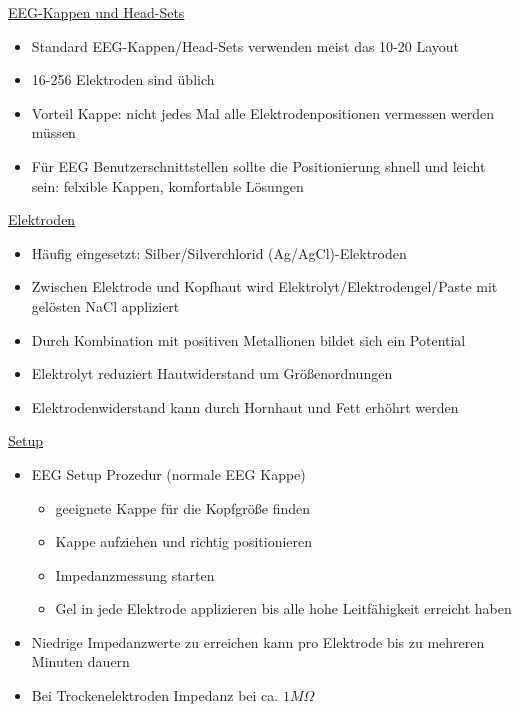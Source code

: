 \documentclass[a4paper,10pt,oneside]{article}
\begin{document}
\underline{EEG-Kappen und Head-Sets} \\
	\begin{itemize}
		\item Standard EEG-Kappen/Head-Sets verwenden meist das 10-20 Layout
		\item 16-256 Elektroden sind üblich
		\item Vorteil Kappe: nicht jedes Mal alle Elektrodenpositionen vermessen werden müssen
		\item Für EEG Benutzerschnittstellen sollte die Positionierung shnell und leicht sein: felxible Kappen, komfortable Lösungen
	\end{itemize}
 		
\underline{Elektroden} \\
	\begin{itemize}
		\item Häufig eingesetzt: Silber/Silverchlorid (Ag/AgCl)-Elektroden
		\item Zwischen Elektrode und Kopfhaut wird Elektrolyt/Elektrodengel/Paste mit gelösten NaCl appliziert
		\item Durch Kombination mit positiven Metallionen bildet sich ein Potential
		\item Elektrolyt reduziert Hautwiderstand um Größenordnungen
		\item Elektrodenwiderstand kann durch Hornhaut und Fett erhöhrt werden
	\end{itemize}

\underline{Setup} \\
	\begin{itemize}
		\item EEG Setup Prozedur (normale EEG Kappe)
			\begin{itemize}
				\item geeignete Kappe für die Kopfgröße finden
				\item Kappe aufziehen und richtig positionieren
				\item Impedanzmessung starten
				\item Gel in jede Elektrode applizieren bis alle hohe Leitfähigkeit erreicht haben
			\end{itemize}
		\item Niedrige Impedanzwerte zu erreichen kann pro Elektrode bis zu mehreren Minuten dauern
		\item Bei Trockenelektroden Impedanz bei ca. $1M\Omega$
	\end{itemize}
	
\end{document}
